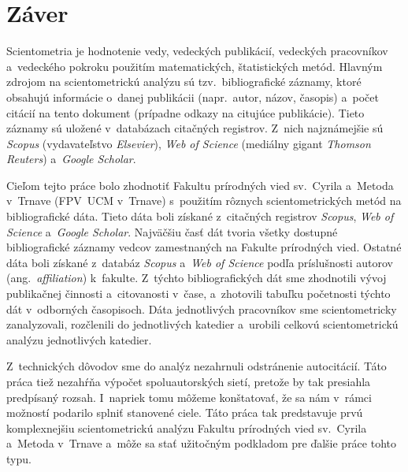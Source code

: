 \chapter*{Záver}

Scientometria je hodnotenie vedy, vedeckých publikácií, vedeckých pracovníkov
a~vedeckého pokroku použitím matematických, štatistických metód.  Hlavným zdrojom
na scientometrickú analýzu sú tzv.~bibliografické záznamy, ktoré obsahujú
informácie o~danej publikácii (napr.~autor, názov, časopis) a~počet citácií na
tento dokument (prípadne odkazy na citujúce publikácie).  Tieto záznamy sú
uložené v~databázach citačných registrov.  Z~nich najznámejšie sú \emph{Scopus}
(vydavateľstvo \emph{Elsevier}), \emph{Web of Science} (mediálny gigant
\emph{Thomson Reuters}) a~\emph{Google Scholar}.

Cieľom tejto práce bolo zhodnotiť Fakultu prírodných vied sv.~Cyrila a~Metoda
v~Trnave (FPV~UCM v~Trnave) s~použitím rôznych scientometrických metód na
bibliografické dáta.  Tieto dáta boli získané z~citačných registrov
\emph{Scopus}, \emph{Web of Science} a~\emph{Google Scholar}.  Najväčšiu časť
dát tvoria všetky dostupné bibliografické záznamy vedcov zamestnaných na Fakulte
prírodných vied.  Ostatné dáta boli získané z~databáz \emph{Scopus} a~\emph{Web
  of Science} podľa príslušnosti autorov (ang.~\emph{affiliation}) k~fakulte.
Z~týchto bibliografických dát sme zhodnotili vývoj publikačnej činnosti
a~citovanosti v~čase, a~zhotovili tabuľku početnosti týchto dát v~odborných
časopisoch.  Dáta jednotlivých pracovníkov sme scientometricky zanalyzovali,
rozčlenili do jednotlivých katedier a~urobili celkovú scientometrickú analýzu
jednotlivých katedier.

Z~technických dôvodov sme do analýz nezahrnuli odstránenie autocitácií.  Táto
práca tiež nezahŕňa výpočet spoluautorských sietí, pretože by tak presiahla
predpísaný rozsah.  I~napriek tomu môžeme konštatovať, že sa nám v~rámci
možností podarilo splniť stanovené ciele.  Táto práca tak predstavuje prvú
komplexnejšiu scientometrickú analýzu Fakultu prírodných vied sv.~Cyrila
a~Metoda v~Trnave a~môže sa stať užitočným podkladom pre ďalšie práce tohto typu.

